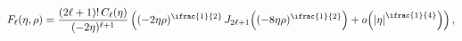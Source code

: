 \[\mathop{F_{\ell}\/}\nolimits\!\left(\eta,\rho\right)=\dfrac{(2\ell+1)!\mathop{%
C_{\ell}\/}\nolimits\!\left(\eta\right)}{(-2\eta)^{\ell+1}}\left((-2\eta\rho)^%
{\ifrac{1}{2}}\*\mathop{J_{2\ell+1}\/}\nolimits\!\left((-8\eta\rho)^{\ifrac{1}%
{2}}\right)+\mathop{o\/}\nolimits\!\left(\left|\eta\right|^{\ifrac{1}{4}}%
\right)\right),\]